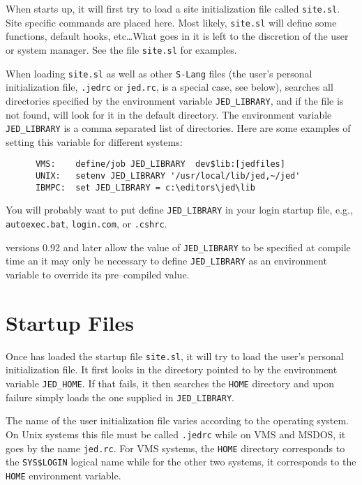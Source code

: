   When \jed{} starts up, it will first try to load a site initialization file
  called \verb|site.sl|.  Site specific commands are placed here.  Most
  likely, \verb|site.sl| will define some functions, default hooks,
  etc\ldots  What goes in it is left to the discretion of the user or system
  manager. See the file \verb|site.sl| for examples.

  When loading \verb|site.sl| as well as other \verb|S-Lang| files (the
  user's personal initialization file, \verb|.jedrc| or \verb|jed.rc|, is a
  special case, see below), \jed{} searches all directories specified by the
  environment variable \verb|JED_LIBRARY|, and if the file is not found, \jed{}
  will look for it in the default directory. The environment variable
  \verb|JED_LIBRARY| is a comma separated list of directories.  Here are
  some examples of setting this variable for different systems:

\begin{verbatim}
      VMS:    define/job JED_LIBRARY  dev$lib:[jedfiles]
      UNIX:   setenv JED_LIBRARY '/usr/local/lib/jed,~/jed'
      IBMPC:  set JED_LIBRARY = c:\editors\jed\lib
\end{verbatim} %


  You will probably want to put define \verb|JED_LIBRARY| in your login
  startup file, e.g., \verb|autoexec.bat|, \verb|login.com|, or
  \verb|.cshrc|.

  \jed{} versions 0.92 and later allow the value of \verb|JED_LIBRARY| to be
  specified at compile time an it may only be necessary to define
  \verb|JED_LIBRARY| as an environment variable to override its
  pre--compiled value.

\section{Startup Files}

  Once \jed{} has loaded the startup file \verb|site.sl|, it will try to load
  the user's personal initialization file.  It first looks in the directory
  pointed to by the environment variable \verb|JED_HOME|. If that fails, it
  then searches the \verb|HOME| directory and upon failure simply loads the
  one supplied in \verb|JED_LIBRARY|.

  The name of the user initialization file varies according to the operating
  system.  On Unix systems this file must be called \verb|.jedrc| while on
  VMS and MSDOS, it goes by the name \verb|jed.rc|.  For VMS systems, the
  \verb|HOME| directory corresponds to the \verb|SYS$LOGIN| %
  logical name while for the other two systems, it corresponds to the
  \verb|HOME| environment variable.

